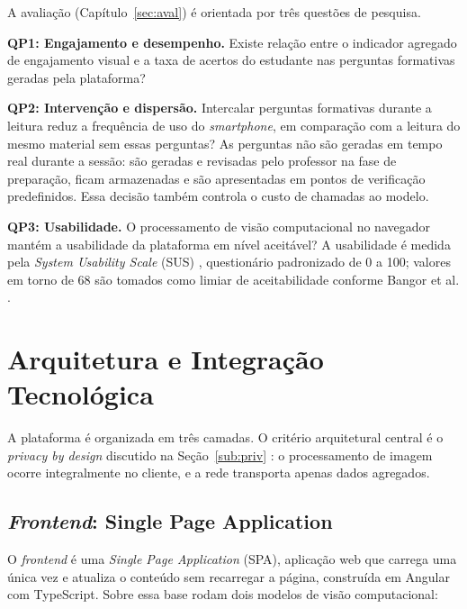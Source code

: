 \documentclass[12pt,a4paper]{article}
\begin{document}
A avaliação (Capítulo~\ref{sec:aval}) é orientada por três questões de pesquisa.

\textbf{QP1: Engajamento e desempenho.} Existe relação entre o indicador agregado de engajamento visual e a taxa de acertos do estudante nas perguntas formativas geradas pela plataforma?

\textbf{QP2: Intervenção e dispersão.} Intercalar perguntas formativas durante a leitura reduz a frequência de uso do \emph{smartphone}, em comparação com a leitura do mesmo material sem essas perguntas? As perguntas não são geradas em tempo real durante a sessão: são geradas e revisadas pelo professor na fase de preparação, ficam armazenadas e são apresentadas em pontos de verificação predefinidos. Essa decisão também controla o custo de chamadas ao modelo.

\textbf{QP3: Usabilidade.} O processamento de visão computacional no navegador mantém a usabilidade da plataforma em nível aceitável? A usabilidade é medida pela \emph{System Usability Scale} (SUS) \cite{Bro96}, questionário padronizado de 0 a 100; valores em torno de 68 são tomados como limiar de aceitabilidade conforme Bangor et al. \cite{BKM08}.

\section{Arquitetura e Integração Tecnológica}\label{sec:arq}

A plataforma é organizada em três camadas. O critério arquitetural central é o \emph{privacy by design} discutido na Seção~\ref{sub:priv} \cite{HBF19,UNE21}: o processamento de imagem ocorre integralmente no cliente, e a rede transporta apenas dados agregados.

\subsection{\emph{Frontend}: Single Page Application}

O \emph{frontend} é uma \emph{Single Page Application} (SPA), aplicação web que carrega uma única vez e atualiza o conteúdo sem recarregar a página, construída em Angular com TypeScript. Sobre essa base rodam dois modelos de visão computacional:
\end{document}
